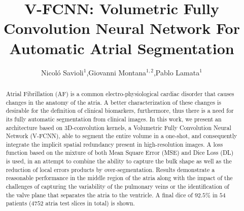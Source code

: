 \documentclass{llncs}
\begin{document}
%
%
\pagestyle{headings}  %
%
%
\mainmatter              %
%
\title{V-FCNN: Volumetric Fully Convolution Neural Network For Automatic Atrial Segmentation}

\author{Nicol\'o Savioli$^{1}$,Giovanni Montana$^{1,2}$,Pablo Lamata$^{1}$}%





\maketitle

\begin{abstract}

Atrial Fibrillation (AF) is a common electro-physiological cardiac disorder that causes changes in the anatomy of the atria. A better characterization of these changes is desirable for the definition of clinical biomarkers, furthermore, thus there is a need for its fully automatic segmentation from clinical images.
In this work, we present an architecture based on 3D-convolution kernels, a Volumetric Fully Convolution Neural Network (V-FCNN),
able to segment the entire volume in a one-shot, and consequently integrate the implicit spatial redundancy present in high-resolution images. A loss function based on the mixture of both Mean Square Error (MSE) and Dice Loss (DL) is used, in an attempt to combine the ability to capture the bulk shape as well as the reduction of local errors products by over-segmentation. Results demonstrate a reasonable performance in the middle region of the atria along with the impact of the challenges of capturing the variability of the pulmonary veins or the identification of the valve plane that separates the atria to the ventricle. A final dice of $92.5\%$ in $54$ patients ($4752$ atria test slices in total) is shown.

\end{abstract}
\end{document}
